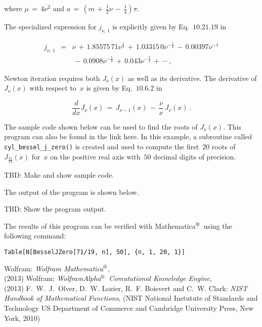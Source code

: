 \documentclass{article}[10pt]
\def\trademarksymbolr   {$^{\text{\rm{\scriptsize{\textregistered}}}}$}
\def\mathematica        {{Mathematica\trademarksymbolr}}
\def\wolframalpha       {{WolframAlpha\trademarksymbolr}}
\begin{document}
\noindent
where $\mu\,=\,4\nu^2$
and
$a\,=\,\left(m\,+\,\frac{1}{2}\nu\,-\,\frac{1}{4}\right)\pi$.

\vspace{2pt}

The specialized expression for $j_{\nu,\,1}$
is explicitly given by
Eq.~$10$.$21$.$19$ in~\cite{bibitem:nisthandbook}

\begin{eqnarray}
j_{\nu,\,1}
& = &
\nu
\,+\,
1.85575\,71\nu^{\frac{1}{3}}
\,+\,
1.03315\,0\nu^{-\frac{1}{3}}
\,-\,
0.00397\nu^{-1}
\nonumber \\
&&
\,-\,
0.0908\nu^{-\frac{5}{3}}
\,+\,
0.043\nu^{-\frac{7}{3}}
\,+\,\cdots
\,{\text{,}}
\end{eqnarray}

Newton iteration requires both $J_{\nu}(x)$ as well as
its derivative. The derivative of $J_{\nu}(x)$
with respect to~$x$ is given by
Eq.~$10$.$6$.$2$ in~\cite{bibitem:nisthandbook}

\begin{equation}
\dfrac{d}{dx}J_{\nu}(x)
\,=\,
J_{\nu - 1}(x)
\,-\,
\frac{\nu}{x}\,J_{\nu}(x)
\,{\text{.}}
\end{equation}

The sample code shown below can be used to find
the roots of $J_{\nu}(x)$. This program
can also be found in the link here.
In this example, a subroutine called
\lstinline|cyl_bessel_j_zero()| is created
and used to compute the first~$20$ roots of~$J_\frac{71}{19}(x)$
for~$x$ on the positive real axis with~$50$ decimal digits
of precision.

\vspace{2pt}

TBD: Make and show sample code.

The output of the program is shown below.

TBD: Show the program output.

The results of this program can be verified with
\mathematica\ using the following command:

\begin{verbatim}
Table[N[BesselJZero[71/19, n], 50], {n, 1, 20, 1}]
\end{verbatim}

\begin{thebibliography}{9}
Wolfram: {\textit{Wolfram \mathematica}},\\
{} (2013)
Wolfram: {\textit{\wolframalpha\ Comutational Knowledge Engine}},\\
{} (2013)
F.~W.~J.~Olver, D.~W. Lozier, R.~F. Boisvert and C.~W. Clark:
{\textit{NIST Handbook of Mathematical Functions}},
(NIST National Instutute of Standards and Technology
US Department of Commerce and Cambridge University Press, New York, 2010)
\end{thebibliography}
\end{document}
